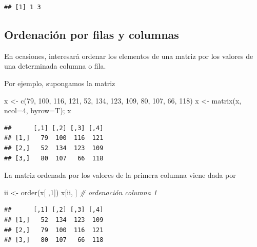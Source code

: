 \documentclass[
]{book}
\newenvironment{Shaded}{\begin{snugshade}}{\end{snugshade}}
\newcommand{\AttributeTok}[1]{\textcolor[rgb]{0.77,0.63,0.00}{#1}}
\newcommand{\CommentTok}[1]{\textcolor[rgb]{0.56,0.35,0.01}{\textit{#1}}}
\newcommand{\DecValTok}[1]{\textcolor[rgb]{0.00,0.00,0.81}{#1}}
\newcommand{\FunctionTok}[1]{\textcolor[rgb]{0.00,0.00,0.00}{#1}}
\newcommand{\NormalTok}[1]{#1}
\newcommand{\OtherTok}[1]{\textcolor[rgb]{0.56,0.35,0.01}{#1}}
\theoremstyle{break}
\begin{document}
\begin{verbatim}
## [1] 1 3
\end{verbatim}

\hypertarget{ordenaciuxf3n-por-filas-y-columnas}{%
\subsection{Ordenación por filas y columnas}\label{ordenaciuxf3n-por-filas-y-columnas}}

En ocasiones, interesará ordenar los elementos de una matriz por los valores de una
determinada columna o fila.

Por ejemplo, supongamos la matriz

\begin{Shaded}
\begin{Highlighting}[]
\NormalTok{x }\OtherTok{\textless{}{-}} \FunctionTok{c}\NormalTok{(}\DecValTok{79}\NormalTok{, }\DecValTok{100}\NormalTok{, }\DecValTok{116}\NormalTok{, }\DecValTok{121}\NormalTok{, }\DecValTok{52}\NormalTok{, }\DecValTok{134}\NormalTok{, }\DecValTok{123}\NormalTok{, }\DecValTok{109}\NormalTok{, }\DecValTok{80}\NormalTok{, }\DecValTok{107}\NormalTok{, }\DecValTok{66}\NormalTok{, }\DecValTok{118}\NormalTok{)}
\NormalTok{x }\OtherTok{\textless{}{-}} \FunctionTok{matrix}\NormalTok{(x, }\AttributeTok{ncol=}\DecValTok{4}\NormalTok{, }\AttributeTok{byrow=}\NormalTok{T); x}
\end{Highlighting}
\end{Shaded}

\begin{verbatim}
##      [,1] [,2] [,3] [,4]
## [1,]   79  100  116  121
## [2,]   52  134  123  109
## [3,]   80  107   66  118
\end{verbatim}

La matriz ordenada por los valores de la primera columna viene dada por

\begin{Shaded}
\begin{Highlighting}[]
\NormalTok{ii }\OtherTok{\textless{}{-}} \FunctionTok{order}\NormalTok{(x[ ,}\DecValTok{1}\NormalTok{])}
\NormalTok{x[ii, ]  }\CommentTok{\# ordenación columna 1}
\end{Highlighting}
\end{Shaded}

\begin{verbatim}
##      [,1] [,2] [,3] [,4]
## [1,]   52  134  123  109
## [2,]   79  100  116  121
## [3,]   80  107   66  118
\end{verbatim}
\end{document}

